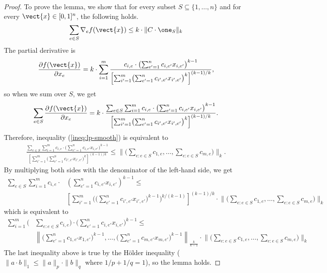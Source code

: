 \begin{proof}
To prove the lemma, we show that for every subset $S \subseteq \{1, \ldots, n\}$ and for every $\vect{x} \in [0,1]^{n}$, the following holds.
%
\begin{align}	\label{ineq:lp-smooth}
\sum_{e \in S} \nabla_{e} f(\vect{x}) \leq  k \cdot \|C \cdot \one_{S}\|_{k}
\end{align}
%
The partial derivative is
%
\begin{align*}
\frac{\partial f(\vect{x})}{\partial x_{e}}
= k \cdot \sum_{i = 1}^{m} \frac{c_{i,e} \cdot \bigl( \sum_{e' = 1}^{n} c_{i,e'} x_{i,e'} \bigr)^{k-1} }{ \left[ \sum_{i' = 1}^{m}
		\bigl( \sum_{e'= 1}^{n} c_{i',e'} x_{i',e'} \bigr)^{k} \right]^{(k-1)/k}},
\end{align*}
so when we sum over $S$, we get
\begin{align*}
\sum_{e \in S} \frac{\partial f(\vect{x})}{\partial x_{e}}
= k \cdot \frac{ \sum_{e \in S} \sum_{i = 1}^{m} c_{i,e} \cdot \bigl( \sum_{e' = 1}^{n} c_{i,e'} x_{i,e'} \bigr)^{k-1} }{ \left[ \sum_{i' = 1}^{m} \bigl( \sum_{e'= 1}^{n} c_{i',e'} x_{i',e'} \bigr)^{k} \right]^{(k-1)/k}}.
\end{align*}
%
Therefore, inequality (\ref{ineq:lp-smooth}) is equivalent to
\begin{align*}
\frac{ \sum_{e \in S} \sum_{i = 1}^{m} c_{i,e} \cdot \bigl( \sum_{e' = 1}^{n} c_{i,e'} x_{i,e'} \bigr)^{k-1} }{ \left[ \sum_{i' = 1}^{m} \bigl( \sum_{e'= 1}^{n} c_{i',e'} x_{i',e'} \bigr)^{k} \right]^{(k-1)/k}}
	\leq   \biggl \| \biggl( \sum_{e: e \in S} c_{1,e}, \ldots , \sum_{e: e \in S} c_{m,e}  \biggr) \biggr \|_{k}.
\end{align*}
%
By multiplying both sides with the denominator of the left-hand side, we get
%
\begin{align*}
    \sum_{e \in S} \sum_{i = 1}^{m} c_{i,e} \cdot & \left( \sum_{e' = 1}^{n} c_{i,e'} x_{i,e'} \right)^{k-1} \leq \\
    & \left[ \sum_{i'=1}^{m} \biggl( \biggl( \sum_{e'= 1}^{n} c_{i',e'} x_{i',e'} \biggr)^{k-1} \biggr)^{k/(k-1)} \right]^{(k-1)/k} 
    	\cdot \biggl \| \biggl( \sum_{e: e \in S} c_{1,e}, \ldots , \sum_{e: e \in S} c_{m,e}  \biggr) \biggr \|_{k}
\end{align*}
which is equivalent to
\begin{align*}
    \sum_{i=1}^{m} \biggl( & \sum_{e: e \in S} c_{i,e} \biggr) \cdot \biggl( \sum_{e'=1}^{n} c_{i,e'} x_{i,e'} \biggr)^{k-1} \leq \\
    & \left \| \biggl( \sum_{e'=1}^{n} c_{1,e'} x_{1,e'} \biggr)^{k-1}, \ldots, \biggl( \sum_{e'=1}^{n} c_{m,e'} x_{m,e'} \biggr)^{k-1} \right \|_{\frac{k}{k-1}} 
    		\cdot \biggl \| \biggl( \sum_{e: e \in S} c_{1,e}, \ldots , \sum_{e: e \in S} c_{m,e}  \biggr) \biggr \|_{k}
\end{align*}
The last inequality above is true by the H\"older inequality ($\| a \cdot b\|_{1} \leq \| a \|_{p} \cdot \| b \|_{q}$ where $1/p + 1/q = 1$), so the lemma holds.
\end{proof}

